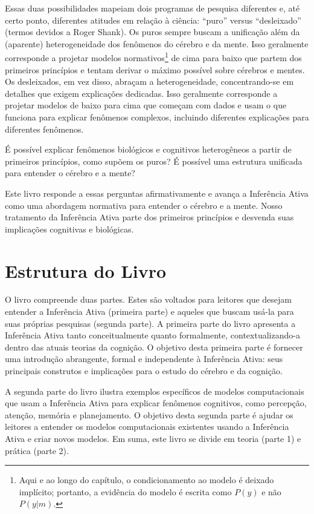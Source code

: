 \documentclass[
  12pt,
]{book}
\begin{document}
Essas duas possibilidades mapeiam dois programas de pesquisa diferentes e, até certo ponto, diferentes atitudes em relação à ciência: ``puro'' versus ``desleixado'' (termos devidos a Roger Shank). Os puros sempre buscam a unificação além da (aparente) heterogeneidade dos fenômenos do cérebro e da mente. Isso geralmente corresponde a projetar modelos normativos\footnote{Aqui e ao longo do capítulo, o condicionamento ao modelo é deixado
  implícito; portanto, a evidência do modelo é escrita como \(P(y)\) e
  não \(P(y|m)\).} de cima para baixo que partem dos primeiros princípios e tentam derivar o máximo possível sobre cérebros e mentes. Os desleixados, em vez disso, abraçam a heterogeneidade, concentrando-se em detalhes que exigem explicações dedicadas. Isso geralmente corresponde a projetar modelos de baixo para cima que começam com dados e usam o que funciona para explicar fenômenos complexos, incluindo diferentes explicações para diferentes fenômenos.

É possível explicar fenômenos biológicos e cognitivos heterogêneos a partir de primeiros princípios, como supõem os puros? É possível uma estrutura unificada para entender o cérebro e a mente?

Este livro responde a essas perguntas afirmativamente e avança a Inferência Ativa como uma abordagem normativa para entender o cérebro e a mente. Nosso tratamento da Inferência Ativa parte dos primeiros princípios e desvenda suas implicações cognitivas e biológicas.

\hypertarget{estrutura-do-livro}{%
\section{Estrutura do Livro}\label{estrutura-do-livro}}

O livro compreende duas partes. Estes são voltados para leitores que desejam entender a Inferência Ativa (primeira parte) e aqueles que buscam usá-la para suas próprias pesquisas (segunda parte). A primeira parte do livro apresenta a Inferência Ativa tanto conceitualmente quanto formalmente, contextualizando-a dentro das atuais teorias da cognição. O objetivo desta primeira parte é fornecer uma introdução abrangente, formal e independente à Inferência Ativa: seus principais construtos e implicações para o estudo do cérebro e da cognição.

A segunda parte do livro ilustra exemplos específicos de modelos computacionais que usam a Inferência Ativa para explicar fenômenos cognitivos, como percepção, atenção, memória e planejamento. O objetivo desta segunda parte é ajudar os leitores a entender os modelos computacionais existentes usando a Inferência Ativa e criar novos modelos. Em suma, este livro se divide em teoria (parte 1) e prática (parte 2).
\end{document}
